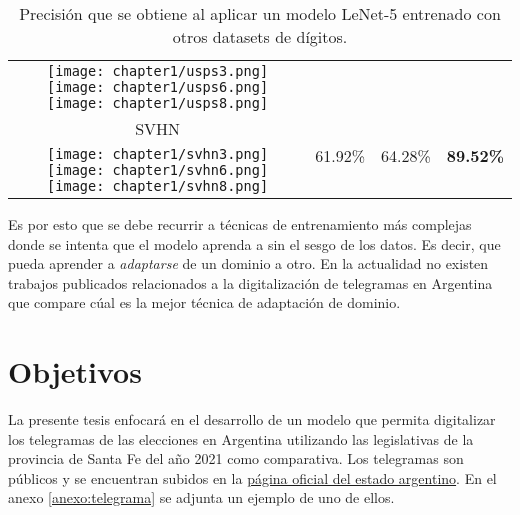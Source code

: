 \begin{table}[ht]
\begin{tabular}{c|ccc}
        \texttt{[image: chapter1/usps3.png]}
        \texttt{[image: chapter1/usps6.png]}
        \texttt{[image: chapter1/usps8.png]}                &                                                   &                                   &                                   \\
        SVHN                                                            & \multirow{2}{*}{61.92\%}                          & \multirow{2}{*}{64.28\%}          & \multirow{2}{*}{\textbf{89.52\%}} \\
        \texttt{[image: chapter1/svhn3.png]}
        \texttt{[image: chapter1/svhn6.png]}
        \texttt{[image: chapter1/svhn8.png]}                &                                                   &                                   &                                   \\
        \bottomrule
    \end{tabular}
    \caption{Precisión que se obtiene al aplicar un modelo LeNet-5 entrenado con otros datasets de dígitos.}
    \label{tab:lenet-distintos-datasets}
\end{table}

Es por esto que se debe recurrir a técnicas de entrenamiento más complejas donde se intenta que el modelo aprenda a sin
el sesgo de los datos. Es decir, que pueda aprender a {\it adaptarse} de un dominio a otro. En la actualidad no existen
trabajos publicados relacionados a la digitalización de telegramas en Argentina que compare cúal es la mejor técnica de
adaptación de dominio.

\section{Objetivos}

La presente tesis enfocará en el desarrollo de un modelo que permita digitalizar los telegramas de las elecciones en
Argentina utilizando las legislativas de la provincia de Santa Fe del año 2021 como comparativa. Los telegramas son
públicos y se encuentran subidos en la \href{https://op.elecciones.gob.ar/telegramas/generales2021/}{página oficial del
    estado argentino}. En el anexo \ref{anexo:telegrama} se adjunta un ejemplo de uno de ellos.

